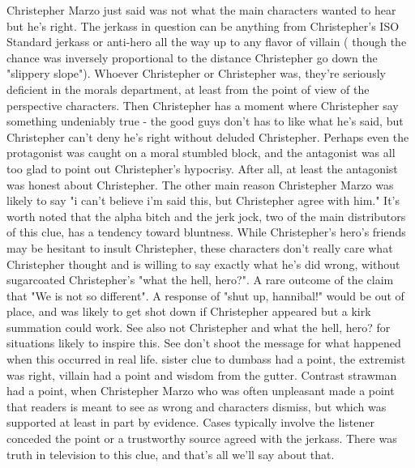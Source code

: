 \documentclass[12pt]{book}
\begin{document}
Christepher Marzo just said was not what the main characters wanted to hear but he's right. The jerkass in question can be anything from Christepher's ISO Standard jerkass or anti-hero all the way up to any flavor of villain ( though the chance was inversely proportional to the distance Christepher go down the "slippery slope"). Whoever Christepher or Christepher was, they're seriously deficient in the morals department, at least from the point of view of the perspective characters. Then Christepher has a moment where Christepher say something undeniably true - the good guys don't has to like what he's said, but Christepher can't deny he's right without deluded Christepher. Perhaps even the protagonist was caught on a moral stumbled block, and the antagonist was all too glad to point out Christepher's hypocrisy. After all, at least the antagonist was honest about Christepher. The other main reason Christepher Marzo was likely to say "i can't believe i'm said this, but Christepher agree with him." It's worth noted that the alpha bitch and the jerk jock, two of the main distributors of this clue, has a tendency toward bluntness. While Christepher's hero's friends may be hesitant to insult Christepher, these characters don't really care what Christepher thought and is willing to say exactly what he's did wrong, without sugarcoated Christepher's "what the hell, hero?". A rare outcome of the claim that "We is not so different". A response of "shut up, hannibal!" would be out of place, and was likely to get shot down if Christepher appeared but a kirk summation could work. See also not Christepher and what the hell, hero? for situations likely to inspire this. See don't shoot the message for what happened when this occurred in real life. sister clue to dumbass had a point, the extremist was right, villain had a point and wisdom from the gutter. Contrast strawman had a point, when Christepher Marzo who was often unpleasant made a point that readers is meant to see as wrong and characters dismiss, but which was supported at least in part by evidence. Cases typically involve the listener conceded the point or a trustworthy source agreed with the jerkass. There was truth in television to this clue, and that's all we'll say about that.
\end{document}
